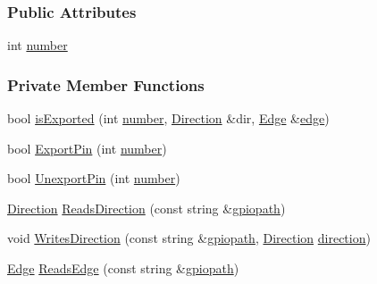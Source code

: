 \subsubsection*{Public Attributes}
\begin{DoxyCompactItemize}
\item 
int \hyperlink{class_hardware_1_1_g_p_i_o_a1671a87bb70911b0a6a29019a068cf96}{number}
\end{DoxyCompactItemize}
\subsubsection*{Private Member Functions}
\begin{DoxyCompactItemize}
\item 
bool \hyperlink{class_hardware_1_1_g_p_i_o_a423f9ac92259cacdca0c82c3ee9b1cdd}{is\+Exported} (int \hyperlink{class_hardware_1_1_g_p_i_o_a1671a87bb70911b0a6a29019a068cf96}{number}, \hyperlink{class_hardware_1_1_g_p_i_o_a7507431d6341c146f22dcdb21b78ffd4}{Direction} \&dir, \hyperlink{class_hardware_1_1_g_p_i_o_a9a7595aabdac9aec75f22e8b86342162}{Edge} \&\hyperlink{class_hardware_1_1_g_p_i_o_adf15f74f053069029e99934e28c109e0}{edge})
\item 
bool \hyperlink{class_hardware_1_1_g_p_i_o_a1a880bee633c9c5227cb36d2d6c63a52}{Export\+Pin} (int \hyperlink{class_hardware_1_1_g_p_i_o_a1671a87bb70911b0a6a29019a068cf96}{number})
\item 
bool \hyperlink{class_hardware_1_1_g_p_i_o_ad56e9d73869a8dacc3245e33df4f5d24}{Unexport\+Pin} (int \hyperlink{class_hardware_1_1_g_p_i_o_a1671a87bb70911b0a6a29019a068cf96}{number})
\item 
\hyperlink{class_hardware_1_1_g_p_i_o_a7507431d6341c146f22dcdb21b78ffd4}{Direction} \hyperlink{class_hardware_1_1_g_p_i_o_a875d4f95ff3e6a70196660faa0477cf5}{Reads\+Direction} (const string \&\hyperlink{class_hardware_1_1_g_p_i_o_ac47062ed6aba52b9e8506e1575bf5061}{gpiopath})
\item 
void \hyperlink{class_hardware_1_1_g_p_i_o_a73426139a22b7e489a9c402678a477e4}{Writes\+Direction} (const string \&\hyperlink{class_hardware_1_1_g_p_i_o_ac47062ed6aba52b9e8506e1575bf5061}{gpiopath}, \hyperlink{class_hardware_1_1_g_p_i_o_a7507431d6341c146f22dcdb21b78ffd4}{Direction} \hyperlink{class_hardware_1_1_g_p_i_o_a77e93e4f6650507fdc4898d272d540e7}{direction})
\item 
\hyperlink{class_hardware_1_1_g_p_i_o_a9a7595aabdac9aec75f22e8b86342162}{Edge} \hyperlink{class_hardware_1_1_g_p_i_o_ac5a3c6d1a0ce58a0b2ee0752623810e4}{Reads\+Edge} (const string \&\hyperlink{class_hardware_1_1_g_p_i_o_ac47062ed6aba52b9e8506e1575bf5061}{gpiopath})

\end{DoxyCompactItemize}
